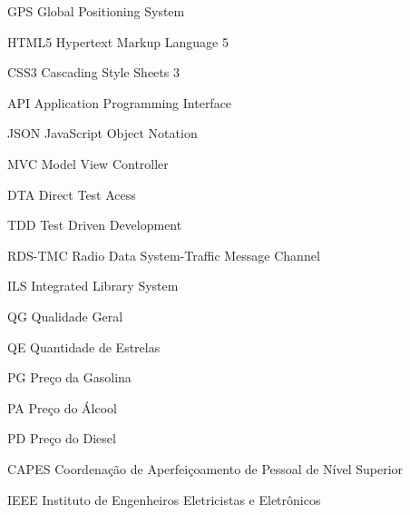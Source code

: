 \begin{siglas}
  \item[GPS] Global Positioning System
  \item[HTML5] Hypertext Markup Language 5
  \item[CSS3] Cascading Style Sheets 3
  \item[API] Application Programming Interface
  \item[JSON] JavaScript Object Notation
  \item[MVC] Model View Controller
  \item[DTA] Direct Test Acess
  \item[TDD] Test Driven Development
  \item[RDS-TMC] Radio Data System-Traffic Message Channel
  \item[ILS] Integrated Library System
  \item[QG] Qualidade Geral
  \item[QE] Quantidade de Estrelas
  \item[PG]	Preço da Gasolina
  \item[PA] Preço do Álcool
  \item[PD] Preço do Diesel
  \item[CAPES] Coordenação de Aperfeiçoamento de Pessoal de Nível Superior
  \item[IEEE] Instituto de Engenheiros Eletricistas e Eletrônicos
\end{siglas}

